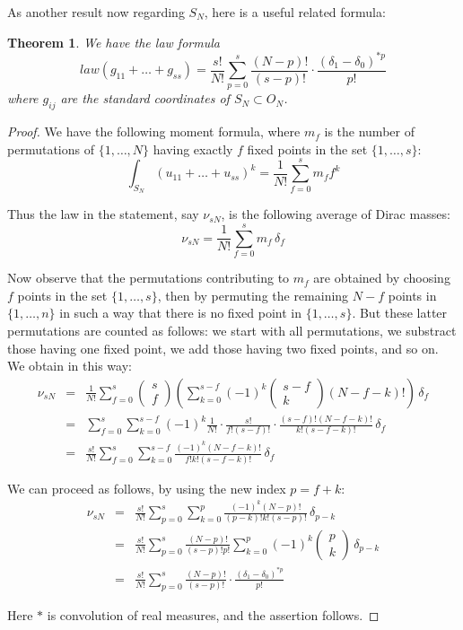 \documentclass[12pt]{amsbook}
\newtheorem{theorem}{Theorem}[chapter]
\begin{document}
As another result now regarding $S_N$, here is a useful related formula:

\begin{theorem}
We have the law formula
$$law(g_{11}+\ldots +g_{ss})=\frac{s!}{N!}\sum_{p=0}^s\frac{(N-p)!}{(s-p)!}
\cdot\frac{\left(\delta_1-\delta_0\right)^{*p}}{p!}$$ 
where $g_{ij}$ are the standard coordinates of $S_N\subset O_N$.
\end{theorem}

\begin{proof}
We have the following moment formula, where $m_f$ is the number of permutations of $\{1,\ldots ,N\}$ having exactly $f$ fixed points in the set $\{1,\ldots ,s\}$: 
$$\int_{S_N}(u_{11}+\ldots +u_{ss})^k=\frac{1}{N!}\sum_{f=0}^sm_ff^k$$

Thus the law in the statement, say $\nu_{sN}$, is the following average
of Dirac masses:
$$\nu_{sN}=\frac{1}{N!}\sum_{f=0}^s m_{f}\,\delta_f$$

Now observe that the permutations contributing to $m_f$ are obtained by choosing $f$
points in the set $\{1,\ldots ,s\}$, then by permuting the remaining $N-f$ points in $\{1,\ldots ,n\}$ in such a way that there is no fixed point in $\{1,\ldots,s\}$. But these latter permutations are counted as follows: we start with all permutations, we substract those having one fixed point, we add those having two fixed points, and so on. We obtain in this way:
\begin{eqnarray*}
\nu_{sN}
&=&\frac{1}{N!}\sum_{f=0}^s\begin{pmatrix}s\\
f\end{pmatrix}\left(\sum_{k=0}^{s-f}(-1)^k
\begin{pmatrix}s-f\\ k\end{pmatrix}(N-f-k)!\right)\,\delta_f\\
&=&\sum_{f=0}^s\sum_{k=0}^{s-f}(-1)^k\frac{1}{N!}\cdot
\frac{s!}{f!(s-f)!}\cdot\frac{(s-f)!(N-f-k)!}{k!(s-f-k)!}\,\delta_f\\
&=&\frac{s!}{N!}\sum_{f=0}^s\sum_{k=0}^{s-f}\frac{(-1)^k(N-f-k)!}{f!k!(s-f-k)!}\,\delta_f
\end{eqnarray*}

We can proceed as follows, by using the new index $p=f+k$:
\begin{eqnarray*}
\nu_{sN}
&=&\frac{s!}{N!}\sum_{p=0}^s\sum_{k=0}^{p}\frac{(-1)^k
(N-p)!}{(p-k)!k!(s-p)!}\,\delta_{p-k}\\
&=&\frac{s!}{N!}\sum_{p=0}^s\frac{(N-p)!}{(s-p)!p!}
\sum_{k=0}^{p}(-1)^k\begin{pmatrix}p\\
k\end{pmatrix}\,\delta_{p-k}\\
&=&\frac{s!}{N!}\sum_{p=0}^s\frac{(N-p)!}{(s-p)!}\cdot
\frac{\left(\delta_1-\delta_0\right)^{*p}}{p!}
\end{eqnarray*}

Here $*$ is convolution of real measures, and the assertion follows.
\end{proof}
\end{document}

